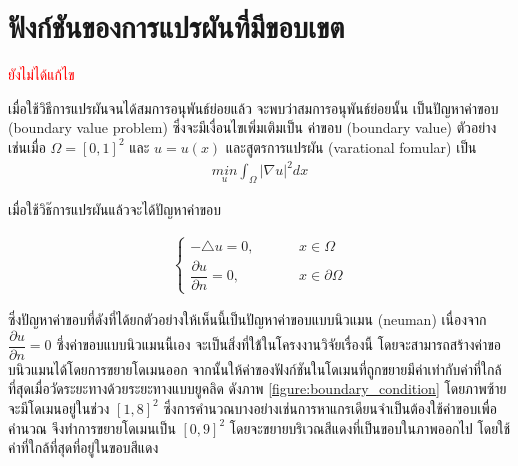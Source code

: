 \section{ฟังก์ชันของการแปรผันที่มีขอบเขต}
\textcolor{red}{ยังไม่ได้แก้ไข} 

\hspace{1cm} เมื่อใช้วิธีการแปรผันจนได้สมการอนุพันธ์ย่อยแล้ว จะพบว่าสมการอนุพันธ์ย่อยนั้น เป็นปัญหาค่าขอบ (boundary value problem) ซึ่งจะมีเงื่อนไขเพิ่มเติมเป็น ค่าขอบ (boundary value) ตัวอย่างเช่นเมื่อ $\Omega = [0,1]^2$ และ $u=u(x)$ และสูตรการแปรผัน (varational fomular) เป็น 
\begin{align*}
    \underset{u}{{min}} \int_{\Omega} |\nabla u |^2 dx
\end{align*}

เมื่อใช้วิธ๊การแปรผันแล้วจะได้ปัญหาค่าขอบ

\begin{align*}
\left \{ \begin{array}{ll}  - \triangle u = 0,  & \hspace{1cm} x \in \Omega \\ \dfrac{\partial u}{\partial n} = 0, & \hspace{1cm} x \in \partial \Omega \end{array} \right .
\end{align*}

\hspace{1cm} ซึ่งปัญหาค่าขอบที่ดังที่ได้ยกตัวอย่างให้เห็นนี้เป็นปัญหาค่าขอบแบบนิวแมน (neuman) เนื่องจาก $\dfrac{\partial u}{\partial n} = 0$ ซึ่งค่าขอบแบบนิวแมนนี้เอง จะเป็นสิ่งที่ใช้ในโครงงานวิจัยเรื่องนี้ โดยจะสามารถสร้างค่าขอบนิวแมนได้โดยการขยายโดเมนออก จากนั้นให้ค่าของฟังก์ชันในโดเมนที่ถูกขยายมีค่าเท่ากับค่าที่ใกล้ที่สุดเมื่อวัดระยะทางด้วยระยะทางแบบยูคลิด ดังภาพ \ref{figure:boundary_condition} โดยภาพซ้ายจะมีโดเมนอยู่ในช่วง $[1,8]^2$ ซึ่งการคำนวณบางอย่างเช่นการหาแกรเดียนจำเป็นต้องใช้ค่าขอบเพื่อคำนวณ จึงทำการขยายโดเมนเป็น $[0,9]^2$ โดยจะขยายบริเวณสีแดงที่เป็นขอบในภาพออกไป โดยใช้ค่าที่ใกล้ที่สุดที่อยู่ในขอบสีแดง



